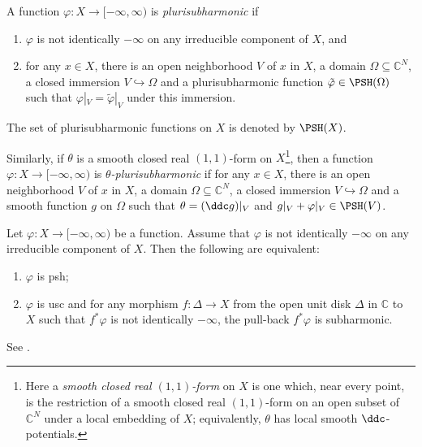 \begin{definition}\label{def:unibranch:L105}
    A function $\varphi\colon X\rightarrow [-\infty,\infty)$ is \emph{plurisubharmonic} if
	\begin{enumerate}
		\item\label{itm:appendix-unibranch:L107:1} $\varphi$ is not identically $-\infty$ on any irreducible component of $X$, and
		\item\label{itm:appendix-unibranch:L107:2} for any $x\in X$, there is an open neighborhood $V$ of $x$ in $X$, a domain $\Omega\subseteq \mathbb{C}^N$, a closed immersion $V\hookrightarrow \Omega$ and a plurisubharmonic function $\tilde{\varphi}\in \PSH(\Omega)$ such that $\varphi|_V=\tilde{\varphi}|_V$ under this immersion.
	\end{enumerate}
	The set of plurisubharmonic functions on $X$ is denoted by $\PSH(X)$.

    Similarly, if $\theta$ is a smooth closed real $(1,1)$-form on $X$\footnote{Here a \emph{smooth closed real $(1,1)$-form} on $X$ is one which, near every point, is the restriction of a smooth closed real $(1,1)$-form on an open subset of $\mathbb{C}^N$ under a local embedding of $X$; equivalently, $\theta$ has local smooth $\ddc$-potentials.}, then a function $\varphi\colon X\rightarrow [-\infty,\infty)$ is \emph{$\theta$-plurisubharmonic} if for any $x\in X$, there is an open neighborhood $V$ of $x$ in $X$, a domain $\Omega\subseteq \mathbb{C}^N$, a closed immersion $V\hookrightarrow \Omega$ and a smooth function $g$ on $\Omega$ such that $\theta=(\ddc g)|_V$ and $g|_V+\varphi|_V\in \PSH(V)$.
\end{definition}


\begin{theorem}\label{thm:FN}
	Let $\varphi\colon X\rightarrow [-\infty,\infty)$ be a function. Assume that $\varphi$ is not identically $-\infty$ on any irreducible component of $X$. Then the following are equivalent:
	\begin{enumerate}
		\item\label{itm:thm:FN:1} $\varphi$ is psh;
		\item\label{itm:thm:FN:2} $\varphi$ is usc and for any morphism $f\colon \Delta\rightarrow X$ from the open unit disk $\Delta$ in $\mathbb{C}$ to $X$ such that $f^*\varphi$ is not identically $-\infty$, the pull-back $f^*\varphi$ is subharmonic.
	\end{enumerate}
\end{theorem}
See \cite{FN80}.





